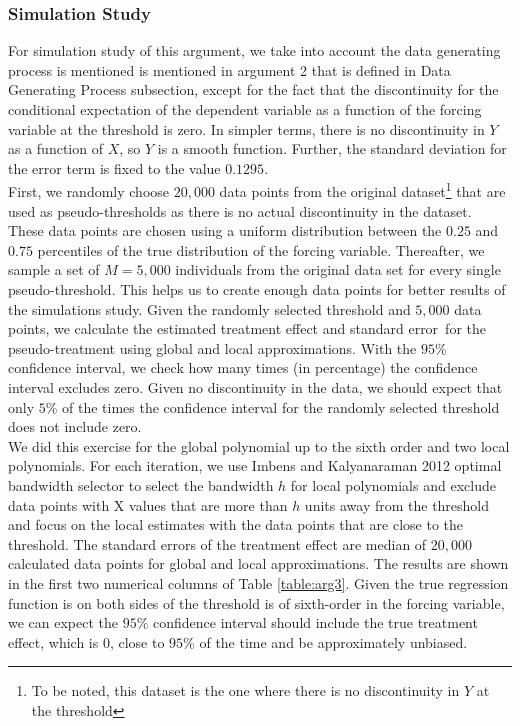 \documentclass[fleqn]{article}
\begin{document}
    \subsubsection{Simulation Study}
    \label{subsubsec: arg3 sim study}

    For simulation study of this argument, we take into account the data generating process is mentioned is mentioned in argument 2 that is defined in Data Generating Process subsection, except for the fact that the discontinuity for the conditional expectation of the dependent variable as a function of the forcing variable at the threshold is zero. In simpler terms, there is no discontinuity in $Y$ as a function of $X$, so $Y$ is a smooth function. Further, the standard deviation for the error term is fixed to the value $0.1295$. \\

    First, we randomly choose $20,000$ data points from the original dataset\footnote{To be noted, this dataset is the one where there is no discontinuity in $Y$ at the threshold} that are used as pseudo-thresholds as there is no actual discontinuity in the dataset. These data points are chosen using a uniform distribution between the $0.25$ and $0.75$ percentiles of the true distribution of the forcing variable. Thereafter, we sample a set of $M = 5,000$ individuals from the original data set for every single pseudo-threshold. This helps us to create enough data points for better results of the simulations study. Given the randomly selected threshold and $5,000$ data points, we calculate the estimated treatment effect and standard error for the pseudo-treatment using global and local approximations. With the $95\%$ confidence interval, we check how many times (in percentage) the confidence interval excludes zero. Given no discontinuity in the data, we should expect that only $5\%$ of the times the confidence interval for the randomly selected threshold does not include zero. \\

    We did this exercise for the global polynomial up to the sixth order and two local polynomials. For each iteration, we use Imbens and Kalyanaraman 2012\cite{imbens2012optimal} optimal bandwidth selector to select the bandwidth $h$ for local polynomials and exclude data points with X values that are more than $h$ units away from the threshold and focus on the local estimates with the data points that are close to the threshold. The standard errors of the treatment effect are median of $20,000$ calculated data points for global and local approximations. The results are shown in the first two numerical columns of Table \ref{table:arg3}. Given the true regression function is on both sides of the threshold is of sixth-order in the forcing variable, we can expect the $95\%$ confidence interval should include the true treatment effect, which is $0$, close to $95\%$ of the time and be approximately unbiased. \\
\end{document}
